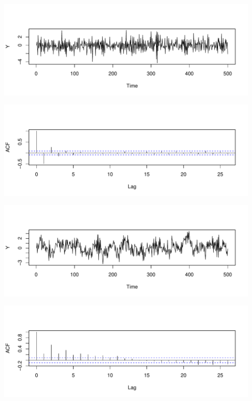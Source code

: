 \documentclass[12pt]{article}
\begin{document}
\begin{center}
\includegraphics[width=1.2\textwidth]{lect02-4a.pdf}
\vspace*{-20mm}

\includegraphics[width=1.2\textwidth]{lect02-4b.pdf}
\end{center}

\begin{center}
\includegraphics[width=1.2\textwidth]{lect02-5a.pdf}
\vspace*{-20mm}

\includegraphics[width=1.2\textwidth]{lect02-5b.pdf}
\end{center}
\end{document}
